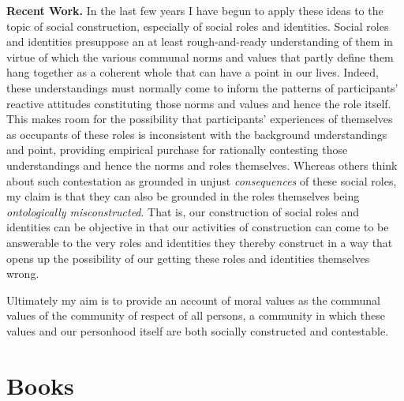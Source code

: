 \documentclass[%
  11pt,%
]{article}
\begin{document}
\noindent\textbf{Recent Work.} In the last few years I have begun to apply these ideas to the topic of social construction, especially of social roles and identities. Social roles and identities presuppose an at least rough-and-ready understanding of them in virtue of which the various communal norms and values that partly define them hang together as a coherent whole that can have a point in our lives. Indeed, these understandings must normally come to inform the patterns of participants' reactive attitudes constituting those norms and values and hence the role itself. This makes room for the possibility that participants' experiences of themselves as occupants of these roles is inconsistent with the background understandings and point, providing empirical purchase for rationally contesting those understandings and hence the norms and roles themselves. Whereas others think about such contestation as grounded in unjust \emph{consequences} of these social roles, my claim is that they can also be grounded in the roles themselves being \emph{ontologically misconstructed}. That is, our construction of social roles and identities can be objective in that our activities of construction can come to be answerable to the very roles and identities they thereby construct in a way that opens up the possibility of our getting these roles and identities themselves wrong.

\bigskip{}

Ultimately my aim is to provide an account of moral values as the communal values of the community of respect of all persons, a community in which these values and our personhood itself are both socially constructed and contestable.


\section{Books}

\nocite{Helm2017Communities-Respect-Persons,Helm2010Love-Friendship-Self,Helm2001Emotional-Reason-Deliberation}

\printbibliography
\end{document}

